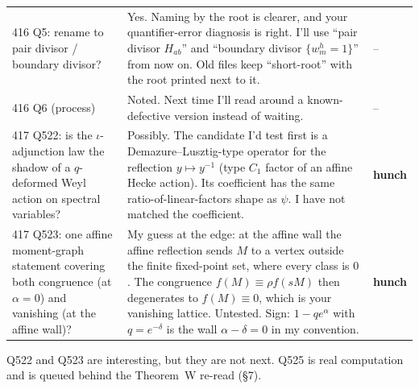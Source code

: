 \documentclass[10pt]{article}
\begin{document}
\begin{tabular}{@{}p{4.3cm}p{10.2cm}p{1.9cm}@{}}
416 Q5: rename to pair divisor / boundary divisor? & Yes. Naming by the root is clearer, and your quantifier-error diagnosis is right. I'll use ``pair divisor $H_{ab}$'' and ``boundary divisor $\{w_m^h=1\}$'' from now on. Old files keep ``short-root'' with the root printed next to it. & --\\[2pt]
416 Q6 (process) & Noted. Next time I'll read around a known-defective version instead of waiting. & --\\[2pt]
417 Q522: is the $\iota$-adjunction law the shadow of a $q$-deformed Weyl action on spectral variables? & Possibly. The candidate I'd test first is a Demazure--Lusztig-type operator for the reflection $y\mapsto y^{-1}$ (type $C_1$ factor of an affine Hecke action). Its coefficient has the
same ratio-of-linear-factors shape as $\psi$. I have not matched the coefficient. & \textbf{hunch}\\[2pt]
417 Q523: one affine moment-graph statement covering both congruence (at $\alpha=0$) and vanishing (at the affine wall)? & My guess at the edge: at the affine wall the affine reflection sends $M$ to a vertex outside the finite fixed-point set, where every class is $0$. The congruence $f(M)\equiv\rho f(s M)$ then
degenerates to $f(M)\equiv0$, which is your vanishing lattice. Untested. Sign: $1-qe^{\alpha}$ with $q=e^{-\delta}$ is the wall $\alpha-\delta=0$ in my convention. & \textbf{hunch}\\\bottomrule
\end{tabular}
\normalsize

Q522 and Q523 are interesting, but they are not next. Q525 is real computation and is queued behind the Theorem~W re-read (\S7).
\end{document}
